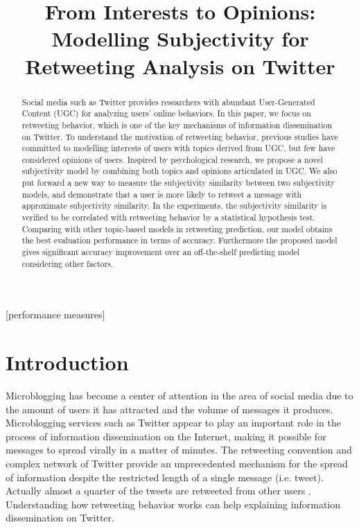 \documentclass{acm_proc_article-sp}
\newcommand{\mo}[1]{\textcolor{red}{#1}}
\begin{document}
\title{From Interests to Opinions: Modelling Subjectivity for Retweeting Analysis on Twitter}

\maketitle
\begin{abstract}
Social media such as Twitter provides researchers with abundant User-Generated Content (UGC) for analyzing users' online behaviors. In this paper, we focus on retweeting behavior, which is one of the key mechanisms of information dissemination on Twitter. 
To understand the motivation of retweeting behavior, previous studies have committed to modelling interests of users with topics derived from UGC, but few have considered opinions of users. 
Inspired by psychological research, we propose a novel subjectivity model by combining both topics and opinions articulated in UGC. 
We also put forward a new way to measure the subjectivity similarity between two subjectivity models, and demonstrate that a user is more likely to retweet a message with approximate subjectivity similarity.  
In the experiments, the subjectivity similarity is verified to be correlated with retweeting behavior by a statistical hypothesis test. 
Comparing with other topic-based models in retweeting prediction, our model obtains the best evaluation performance in terms of accuracy. 
Furthermore the proposed model gives significant accuracy improvement over an off-the-shelf predicting model considering other factors.
\end{abstract}
[performance measures]

\section{Introduction}
\label{introduction}
\noindent Microblogging has become a center of attention in the area of social media due to the amount of users it has attracted and the volume of messages it produces. 
Microblogging services such as Twitter appear to play an important role in the process of information dissemination on the Internet, making it possible for messages to spread virally in a matter of minutes. 
The retweeting convention and complex network of Twitter provide an unprecedented mechanism for the spread of information despite the restricted length of a single message (i.e. tweet). 
Actually almost a quarter of the tweets are retweeted from other users \cite{yang2010understanding}. 
Understanding how retweeting behavior works can help explaining information dissemination on Twitter. 
\end{document}
